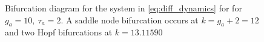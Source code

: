 \begin{figure}[H]
        \caption{\label{fig:bif_hopf_matcont} Bifurcation diagram for the system in \eqref{eq:diff_dynamics} for  for $g_a=10,\ \tau_a=2$. A saddle node bifurcation occurs at $k = g_a + 2 = 12$ and two Hopf bifurcations at $k=13.11590$}
\end{figure}


